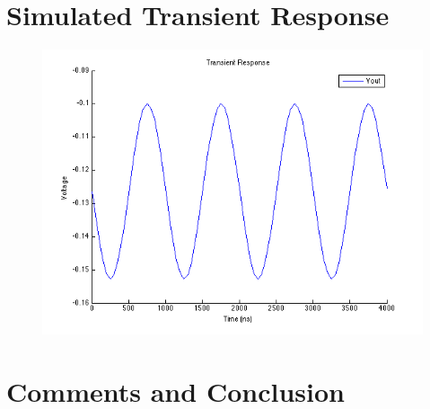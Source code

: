 \documentclass[12pt,a4paper]{article}
\begin{document}
\section{Simulated Transient Response}
\begin{figure}[h]
\centering
\includegraphics[scale=.75]{transient_response.png}
\end{figure}

\pagebreak




\section{Comments and Conclusion}
\end{document}
